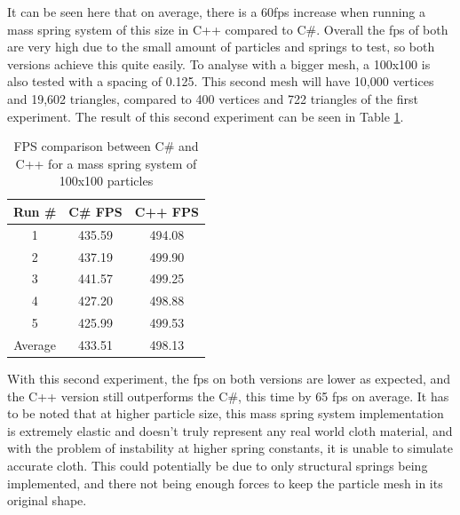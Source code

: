 \documentclass[12pt,a4paper]{article}
\begin{document}
It can be seen here that on average, there is a 60fps increase when running a mass spring system of this size in C++ compared to C\#. Overall the fps of both are very high due to the small amount of particles and springs to test, so both versions achieve this quite easily. To analyse with a bigger mesh, a 100x100 is also tested with a spacing of 0.125. This second mesh will have 10,000 vertices and 19,602 triangles, compared to 400 vertices and 722 triangles of the first experiment. The result of this second experiment can be seen in Table \ref{tab:lang2}. \\
\begin{table}[htbp]
	\centering
	\begin{tabular}{|c|c|c|} %
		\hline %
		Run \# & C\# FPS & C++ FPS \\ %
		\hline %
		1 & 435.59 & 494.08 \\ 
		2 & 437.19 & 499.90 \\ 
		3 & 441.57 & 499.25 \\ 
		4 & 427.20 & 498.88  \\ 
		5 & 425.99 & 499.53  \\ 
		\hline
		Average & 433.51 & 498.13 \\ 
		\hline %
	\end{tabular}
	\caption{FPS comparison between C\# and C++ for a mass spring system of 100x100 particles} %
	\label{tab:lang2}
\end{table}

With this second experiment, the fps on both versions are lower as expected, and the C++ version still outperforms the C\#, this time by 65 fps on average. It has to be noted that at higher particle size, this mass spring system implementation is extremely elastic and doesn't truly represent any real world cloth material, and with the problem of instability at higher spring constants, it is unable to simulate accurate cloth. This could potentially be due to only structural springs being implemented, and there not being enough forces to keep the particle mesh in its original shape. \\
\end{document}
